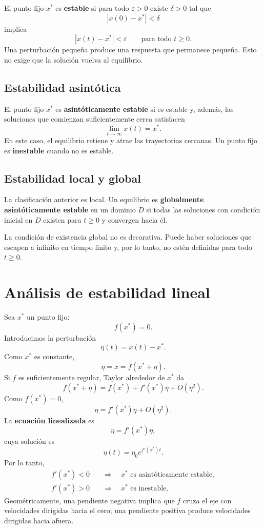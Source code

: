 \documentclass[12pt,a4paper]{article}
\begin{document}
	El punto fijo \(x^\ast\) es \textbf{estable} si para todo \(\varepsilon>0\) existe \(\delta>0\) tal que
	\[
	|x(0)-x^\ast|<\delta
	\]
implica
	\[
	|x(t)-x^\ast|<\varepsilon
	\qquad\text{para todo }t\geq 0.
	\]
Una perturbación pequeña produce una respuesta que permanece pequeña. Esto no exige que la solución vuelva al equilibrio.

	\subsection{Estabilidad asintótica}

	El punto fijo \(x^\ast\) es \textbf{asintóticamente estable} si es estable y, además, las soluciones que comienzan suficientemente cerca satisfacen
	\[
	\lim_{t\to\infty}x(t)=x^\ast.
	\]
En este caso, el equilibrio retiene y atrae las trayectorias cercanas. Un punto fijo es \textbf{inestable} cuando no es estable.

	\subsection{Estabilidad local y global}

	La clasificación anterior es local. Un equilibrio es \textbf{globalmente asintóticamente estable} en un dominio \(D\) si todas las soluciones con condición inicial en \(D\) existen para \(t\geq0\) y convergen hacia él.

	La condición de existencia global no es decorativa. Puede haber soluciones que escapen a infinito en tiempo finito y, por lo tanto, no estén definidas para todo \(t\geq0\).

	\clearpage
	\section{Análisis de estabilidad lineal}

	Sea \(x^\ast\) un punto fijo:
	\[
	f(x^\ast)=0.
	\]
Introducimos la perturbación
	\[
	\eta(t)=x(t)-x^\ast.
	\]
Como \(x^\ast\) es constante,
	\[
	\dot{\eta}=\dot{x}=f(x^\ast+\eta).
	\]
Si \(f\) es suficientemente regular, Taylor alrededor de \(x^\ast\) da
	\[
	f(x^\ast+\eta)
	=
	f(x^\ast)+f'(x^\ast)\eta+O(\eta^2).
	\]
Como \(f(x^\ast)=0\),
	\[
	\dot{\eta}
	=
	f'(x^\ast)\eta+O(\eta^2).
	\]
La \textbf{ecuación linealizada} es
	\[
	\dot{\eta}=f'(x^\ast)\eta,
	\]
cuya solución es
	\[
	\eta(t)=\eta_0e^{f'(x^\ast)t}.
	\]
Por lo tanto,
	\[
	\boxed{
	\begin{aligned}
	f'(x^\ast)<0&\quad\Longrightarrow\quad x^\ast\text{ es asintóticamente estable},\\
	f'(x^\ast)>0&\quad\Longrightarrow\quad x^\ast\text{ es inestable}.
	\end{aligned}}
	\]
Geométricamente, una pendiente negativa implica que \(f\) cruza el eje con velocidades dirigidas hacia el cero; una pendiente positiva produce velocidades dirigidas hacia afuera.
\end{document}
